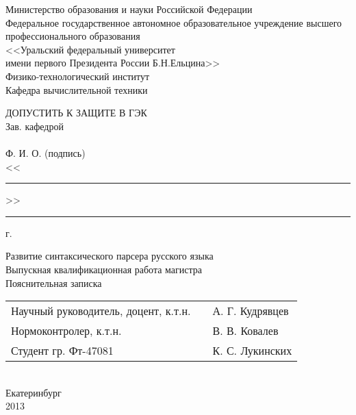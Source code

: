 \thispagestyle{empty}
\begin{center}
Министерство образования и науки  Российской Федерации\\
Федеральное государственное автономное образовательное учреждение 
высшего профессионального образования\\
<<Уральский  федеральный университет\\ имени первого Президента России Б.Н.Ельцина>>\\
Физико-технологический институт\\
Кафедра вычислительной техники\\
\end{center}

\vspace{1cm}

\begin{flushright}
		\begin{minipage}{0.50\textwidth}
			\begin{flushleft}
				ДОПУСТИТЬ К ЗАЩИТЕ В ГЭК\\
				Зав. кафедрой \hrulefill\\
				\hrulefill \space \hrulefill\\
				{\small Ф. И. О.} \hspace{3cm} {\small (подпись)}\\
				<<\rule{1.5cm}{0.2mm}>> \hrulefill {}\rule{1cm}{0.2mm} г.\\
			\end{flushleft}
		\end{minipage}
\end{flushright}

\vspace{1cm}

\begin{center}
{\large Развитие синтаксического парсера русского языка}\\
\vspace{1cm}
Выпускная квалификационная работа магистра\\
Пояснительная записка\\
\vspace{3cm}
	\begin{tabular}{ l c l}
		Научный руководитель, доцент, к.т.н. & \HRule & А. Г. Кудрявцев\\
		Нормоконтролер, к.т.н. & \HRule & В. В. Ковалев\\
		Студент гр. Фт-47081 & \HRule & К. С. Лукинских\\		
	\end{tabular}\\
\vspace{3cm}
Екатеринбург\\
2013
\end{center}
